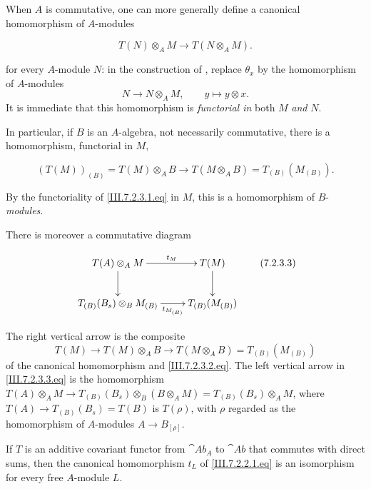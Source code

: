 \begin{env}[7.2.3]
\label{III.7.2.3}
When $A$ is commutative, one can more generally define a
canonical homomorphism of $A$-modules
\begin{env}[7.2.3.1]
\label{III.7.2.3.1}
\[
  T(N)\otimes_A M
  \longrightarrow
  T(N\otimes_A M).
  \tag{7.2.3.1}\label{III.7.2.3.1.eq}
\]
\end{env}
for every $A$-module $N$: in the construction of
, replace $\theta_x$ by the homomorphism of
$A$-modules
\[
  N\longrightarrow N\otimes_A M,
  \qquad
  y\longmapsto y\otimes x.
\]
It is immediate that this homomorphism is \emph{functorial in} both
$M$ \emph{and} $N$.

In particular, if $B$ is an $A$-algebra, not necessarily
commutative, there is a homomorphism, functorial in $M$,
\begin{env}[7.2.3.2]
\label{III.7.2.3.2}
\[
  (T(M))_{(B)}
  =
  T(M)\otimes_A B
  \longrightarrow
  T(M\otimes_A B)
  =
  T_{(B)}(M_{(B)}).
  \tag{7.2.3.2}\label{III.7.2.3.2.eq}
\]
\end{env}
By the functoriality of \eqref{III.7.2.3.1.eq} in $M$, this is
a homomorphism of $B$-\emph{modules}.

There is moreover a commutative diagram
\begin{env}[7.2.3.3]
\label{III.7.2.3.3}
\[
\xymatrix{
  T(A)\otimes_A M
    \ar[r]^-{t_M}\ar[d]
  & T(M)\ar[d]
  \\
  T_{(B)}(B_s)\otimes_B M_{(B)}
    \ar[r]_-{t_{M_{(B)}}}
  & T_{(B)}(M_{(B)})
}
\tag{7.2.3.3}\label{III.7.2.3.3.eq}
\]
\end{env}
The right vertical arrow is the composite
\[
  T(M)
  \longrightarrow
  T(M)\otimes_A B
  \longrightarrow
  T(M\otimes_A B)
  =
  T_{(B)}(M_{(B)})
\]
of the canonical homomorphism and
\eqref{III.7.2.3.2.eq}.  The left vertical arrow in
\eqref{III.7.2.3.3.eq} is the homomorphism $T(A)\otimes_A M\longrightarrow T_{(B)}(B_s)\otimes_B(B\otimes_A M)=T_{(B)}(B_s)\otimes_A M$,
where $T(A)\longrightarrow T_{(B)}(B_s)=T(B)$
is $T(\rho)$, with $\rho$ regarded as the homomorphism of
$A$-modules $A\to B_{[\rho]}$.
\end{env}

\begin{lemma}[7.2.4]
\label{III.7.2.4}
If $T$ is an additive covariant functor from $\cat{Ab}_A$ to
$\cat{Ab}$ that commutes with direct sums, then the canonical
homomorphism $t_L$ of \eqref{III.7.2.2.1.eq} is an isomorphism
for every free $A$-module $L$.
\end{lemma}

